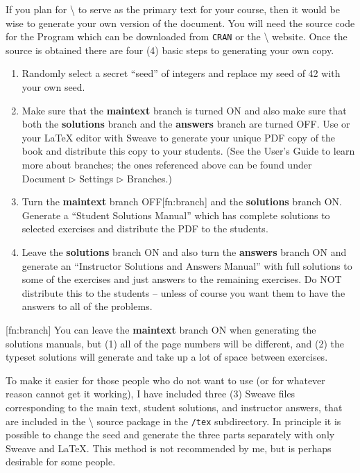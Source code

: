 \documentclass[captions=tableheading]{scrbook}
\begin{document}
If you plan for \IPSUR\textbackslash{} to serve as the primary text for your course, then it would be wise to generate your own version of the document. You will need the source code for the Program which can be downloaded from \texttt{CRAN} or the \IPSUR\textbackslash{} website. Once the source is obtained there are four (4) basic steps to generating your own copy.

\begin{enumerate}
\item Randomly select a secret ``seed'' of integers and replace my seed of 42 with your own seed.
\item Make sure that the \textsf{\textbf{maintext}} branch is turned \textsf{ON} and also make sure that both the \textsf{\textbf{solutions}} branch and the \textsf{\textbf{answers}} branch are turned \textsf{OFF}. Use \LyX{} or your \LaTeX{} editor with Sweave to generate your unique PDF copy of the book and distribute this copy to your students. (See the \LyX{} User's Guide to learn more about branches; the ones referenced above can be found under \textsf{Document $\triangleright$ Settings $\triangleright$ Branches}.)
\item Turn the \textsf{\textbf{maintext}} branch \textsf{OFF}[fn:branch] and the \textsf{\textbf{solutions}} branch \textsf{ON}. Generate a ``Student Solutions Manual'' which has complete solutions to selected exercises and distribute the PDF to the students.
\item Leave the \textsf{\textbf{solutions}} branch \textsf{ON} and also turn the \textsf{\textbf{answers}} branch \textsf{ON} and generate an ``Instructor Solutions and Answers Manual'' with full solutions to some of the exercises and just answers to the remaining exercises. Do NOT distribute this to the students -- unless of course you want them to have the answers to all of the problems.
\end{enumerate}

[fn:branch] You can leave the \textsf{\textbf{maintext}} branch \textsf{ON} when generating the solutions manuals, but (1) all of the page numbers will be different, and (2) the typeset solutions will generate and take up a lot of space between exercises.

To make it easier for those people who do not want to use \LyX{} (or for whatever reason cannot get it working), I have included three (3) Sweave files corresponding to the main text, student solutions, and instructor answers, that are included in the \IPSUR\textbackslash{} source package in the \texttt{/tex} subdirectory. In principle it is possible to change the seed and generate the three parts separately with only Sweave and \LaTeX{}. This method is not recommended by me, but is perhaps desirable for some people.
\end{document}
